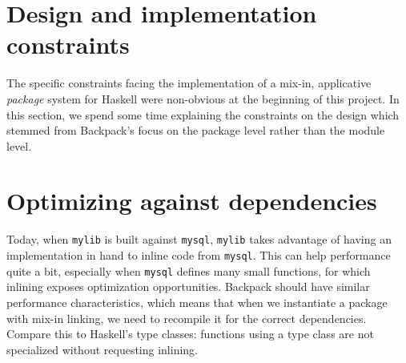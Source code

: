 \section{Design and implementation constraints}


The specific constraints facing the implementation of a mix-in,
applicative \emph{package} system for Haskell were non-obvious at
the beginning of this project.  In this section, we spend some time
explaining the constraints on the design which stemmed from Backpack's
focus on the package level rather than the module level.




\section{Optimizing against dependencies}
\label{sec:optimizing}


Today, when \verb|mylib| is built against \verb|mysql|, \verb|mylib|
takes advantage of having an implementation in hand to inline code from
\verb|mysql|.  This can help performance quite a bit, especially when
\verb|mysql| defines many small functions, for which inlining exposes
optimization opportunities.  Backpack should have similar performance
characteristics, which means that when we instantiate a package with
mix-in linking, we need to recompile it for the correct dependencies.
Compare this to Haskell's type classes: functions using a type class are
not specialized without requesting inlining.

